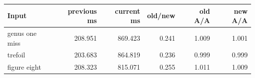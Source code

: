 \begin{center}
\small
\begin{tabular}{lrrrrr}
\toprule
Input & previous ms & current ms & old/new & old A/A & new A/A\\
\midrule
genus one miss & 208.951 & 869.423 & 0.241 & 1.009 & 1.001\\
trefoil & 203.683 & 864.819 & 0.236 & 0.999 & 0.999\\
figure eight & 208.323 & 815.071 & 0.255 & 1.011 & 1.009\\
\bottomrule
\end{tabular}
\end{center}
